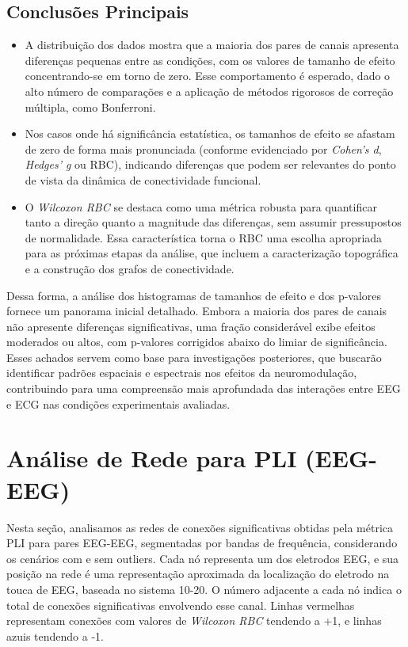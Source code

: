 \subsection{Conclusões Principais}
\begin{itemize}
    \item A distribuição dos dados mostra que a maioria dos pares de canais apresenta diferenças pequenas entre as condições, com os valores de tamanho de efeito concentrando-se em torno de zero. Esse comportamento é esperado, dado o alto número de comparações e a aplicação de métodos rigorosos de correção múltipla, como Bonferroni.
    
    \item Nos casos onde há significância estatística, os tamanhos de efeito se afastam de zero de forma mais pronunciada (conforme evidenciado por \emph{Cohen's d}, \emph{Hedges' g} ou RBC), indicando diferenças que podem ser relevantes do ponto de vista da dinâmica de conectividade funcional.

    \item O \emph{Wilcoxon RBC} se destaca como uma métrica robusta para quantificar tanto a direção quanto a magnitude das diferenças, sem assumir pressupostos de normalidade. Essa característica torna o RBC uma escolha apropriada para as próximas etapas da análise, que incluem a caracterização topográfica e a construção dos grafos de conectividade.

\end{itemize}

Dessa forma, a análise dos histogramas de tamanhos de efeito e dos p-valores fornece um panorama inicial detalhado. Embora a maioria dos pares de canais não apresente diferenças significativas, uma fração considerável exibe efeitos moderados ou altos, com p-valores corrigidos abaixo do limiar de significância. Esses achados servem como base para investigações posteriores, que buscarão identificar padrões espaciais e espectrais nos efeitos da neuromodulação, contribuindo para uma compreensão mais aprofundada das interações entre EEG e ECG nas condições experimentais avaliadas.

\section{Análise de Rede para PLI (EEG-EEG)}
\label{sec:rede_pli_eeg}

Nesta seção, analisamos as redes de conexões significativas obtidas pela métrica PLI para pares EEG-EEG, segmentadas por bandas de frequência, considerando os cenários com e sem outliers. Cada nó representa um dos eletrodos EEG, e sua posição na rede é uma representação aproximada da localização do eletrodo na touca de EEG, baseada no sistema 10-20. O número adjacente a cada nó indica o total de conexões significativas envolvendo esse canal. Linhas vermelhas representam conexões com valores de \emph{Wilcoxon RBC} tendendo a +1, e linhas azuis tendendo a -1.

